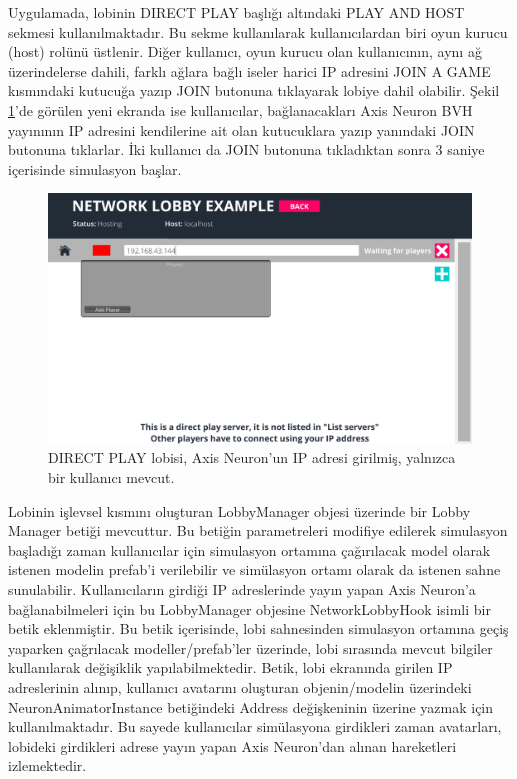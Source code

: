 \documentclass[a4paper, 12pt, titlepage]{article}
\begin{document}
Uygulamada, lobinin DIRECT PLAY başlığı altındaki PLAY AND HOST sekmesi kullanılmaktadır. Bu sekme
kullanılarak kullanıcılardan biri oyun kurucu (host) rolünü üstlenir. Diğer kullanıcı, oyun kurucu
olan kullanıcının, aynı ağ üzerindelerse dahili, farklı ağlara bağlı iseler harici IP adresini JOIN
A GAME kısmındaki kutucuğa yazıp JOIN butonuna tıklayarak lobiye dahil olabilir. Şekil \ref{l1}’de
görülen yeni ekranda ise kullanıcılar, bağlanacakları Axis Neuron BVH yayınının IP adresini
kendilerine ait olan kutucuklara yazıp yanındaki JOIN butonuna tıklarlar. İki kullanıcı da JOIN
butonuna tıkladıktan sonra 3 saniye içerisinde simulasyon başlar.

\begin{figure}
    \centering
        \includegraphics[width=6in]{images/l1}
    \caption{DIRECT PLAY lobisi, Axis Neuron'un IP adresi girilmiş, yalnızca bir kullanıcı mevcut.}
    \label{l1}
\end{figure}

Lobinin işlevsel kısmını oluşturan LobbyManager objesi üzerinde bir Lobby Manager betiği mevcuttur.
Bu betiğin parametreleri modifiye edilerek simulasyon başladığı zaman kullanıcılar için simulasyon
ortamına çağırılacak model olarak istenen modelin prefab’i verilebilir ve simülasyon ortamı olarak
da istenen sahne sunulabilir. Kullanıcıların girdiği IP adreslerinde yayın yapan Axis Neuron’a
bağlanabilmeleri için bu LobbyManager objesine NetworkLobbyHook isimli bir betik eklenmiştir. Bu
betik içerisinde, lobi sahnesinden simulasyon ortamına geçiş yaparken çağrılacak modeller/prefab’ler
üzerinde, lobi sırasında mevcut bilgiler kullanılarak değişiklik yapılabilmektedir. Betik, lobi
ekranında girilen IP adreslerinin alınıp, kullanıcı avatarını oluşturan objenin/modelin üzerindeki
NeuronAnimatorInstance betiğindeki Address değişkeninin üzerine yazmak için kullanılmaktadır. Bu
sayede kullanıcılar simülasyona girdikleri zaman avatarları, lobideki girdikleri adrese yayın yapan
Axis Neuron’dan alınan hareketleri izlemektedir.
\end{document}
